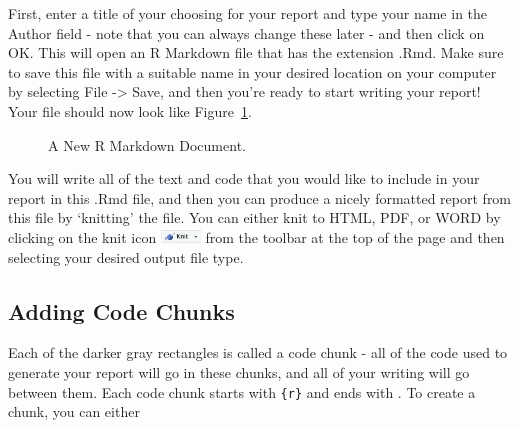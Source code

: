 \documentclass[
  letterpaper,
]{krantz}
\begin{document}
First, enter a title of your choosing for your report and type your name
in the Author field - note that you can always change these later - and
then click on OK. This will open an R Markdown file that has the
extension .Rmd. Make sure to save this file with a suitable name in your
desired location on your computer by selecting File -\textgreater{}
Save, and then you're ready to start writing your report! Your file
should now look like Figure~\ref{fig-rmarkdown-file}.

\begin{figure}


\caption{\label{fig-rmarkdown-file}A New R Markdown Document.}

\end{figure}%

You will write all of the text and code that you would like to include
in your report in this .Rmd file, and then you can produce a nicely
formatted report from this file by `knitting' the file. You can either
knit to HTML, PDF, or WORD by clicking on the knit icon
\includegraphics[width=0.41667in,height=\textheight]{book/images/rmarkdown_reports/knit-icon.png}
from the toolbar at the top of the page and then selecting your desired
output file type.

\subsection{Adding Code Chunks}\label{adding-code-chunks}

Each of the darker gray rectangles is called a code chunk - all of the
code used to generate your report will go in these chunks, and all of
your writing will go between them. Each code chunk starts with
\texttt{\textasciigrave{}\textasciigrave{}\textasciigrave{}\{r\}} and
ends with \texttt{\textasciigrave{}\textasciigrave{}\textasciigrave{}}.
To create a chunk, you can either
\end{document}
